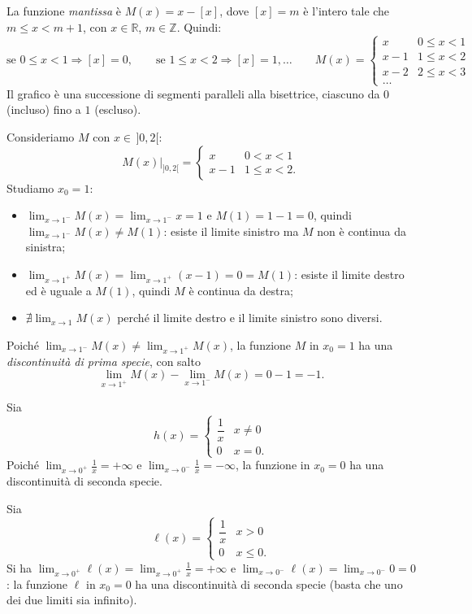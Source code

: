 \documentclass[11pt,a4paper]{article}
\begin{document}
\begin{esempio}
La funzione \emph{mantissa} è $M(x) = x - [x]$, dove $[x] = m$ è l'intero tale che $m \le x < m + 1$, con $x \in \mathbb{R}$, $m \in \mathbb{Z}$. Quindi:
\[
\text{se } 0 \le x < 1 \Rightarrow [x] = 0, \qquad \text{se } 1 \le x < 2 \Rightarrow [x] = 1, \dots
\qquad
M(x) = \begin{cases} x & 0 \le x < 1 \\ x - 1 & 1 \le x < 2 \\ x - 2 & 2 \le x < 3 \\ \dots \end{cases}
\]
Il grafico è una successione di segmenti paralleli alla bisettrice, ciascuno da $0$ (incluso) fino a $1$ (escluso).

Consideriamo $M$ con $x \in\, ]0, 2[$:
\[
M(x)\big|_{]0,2[} = \begin{cases} x & 0 < x < 1 \\ x - 1 & 1 \le x < 2 .\end{cases}
\]
Studiamo $x_0 = 1$:
\begin{itemize}
    \item $\displaystyle\lim_{x\to 1^-} M(x) = \lim_{x\to 1^-} x = 1$ e $M(1) = 1 - 1 = 0$, quindi $\lim_{x\to 1^-} M(x) \neq M(1)$: esiste il limite sinistro ma $M$ non è continua da sinistra;
    \item $\displaystyle\lim_{x\to 1^+} M(x) = \lim_{x\to 1^+} (x-1) = 0 = M(1)$: esiste il limite destro ed è uguale a $M(1)$, quindi $M$ è continua da destra;
    \item $\displaystyle\nexists \lim_{x\to 1} M(x)$ perché il limite destro e il limite sinistro sono diversi.
\end{itemize}
Poiché $\lim_{x\to 1^-} M(x) \neq \lim_{x\to 1^+} M(x)$, la funzione $M$ in $x_0 = 1$ ha una \emph{discontinuità di prima specie}, con salto
\[
\lim_{x\to 1^+} M(x) - \lim_{x\to 1^-} M(x) = 0 - 1 = -1 .
\]
\end{esempio}

\begin{esempio}
Sia
\[
h(x) = \begin{cases} \dfrac{1}{x} & x \neq 0 \\ 0 & x = 0 .\end{cases}
\]
Poiché $\displaystyle\lim_{x\to 0^+}\frac{1}{x} = +\infty$ e $\displaystyle\lim_{x\to 0^-}\frac{1}{x} = -\infty$, la funzione in $x_0 = 0$ ha una discontinuità di seconda specie.

Sia
\[
\ell(x) = \begin{cases} \dfrac{1}{x} & x > 0 \\ 0 & x \le 0 .\end{cases}
\]
Si ha $\displaystyle\lim_{x\to 0^+}\ell(x) = \lim_{x\to 0^+}\frac{1}{x} = +\infty$ e $\displaystyle\lim_{x\to 0^-}\ell(x) = \lim_{x\to 0^-} 0 = 0$: la funzione $\ell$ in $x_0 = 0$ ha una discontinuità di seconda specie (basta che uno dei due limiti sia infinito).
\end{esempio}
\end{document}
